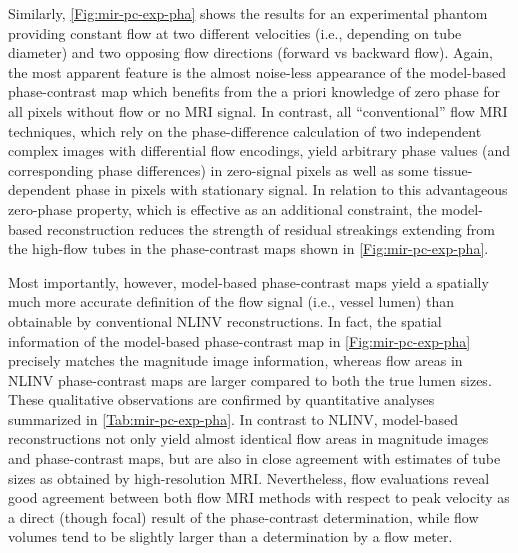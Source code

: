 Similarly, \cref{Fig:mir-pc-exp-pha} shows the results for an experimental phantom providing constant flow at two different velocities (i.e., depending on tube diameter) and two opposing flow directions (forward vs backward flow). Again, the most apparent feature is the almost noise-less appearance of the model-based phase-contrast map which benefits from the a priori knowledge of zero phase for all pixels without flow or no MRI signal. In contrast, all “conventional” flow MRI techniques, which rely on the phase-difference calculation of two independent complex images with differential flow encodings, yield arbitrary phase values (and corresponding phase differences) in zero-signal pixels as well as some tissue-dependent phase in pixels with stationary signal. In relation to this advantageous zero-phase property, which is effective as an additional constraint, the model-based reconstruction reduces the strength of residual streakings extending from the high-flow tubes in the phase-contrast maps shown in \cref{Fig:mir-pc-exp-pha}.

Most importantly, however, model-based phase-contrast maps yield a spatially much more accurate definition of the flow signal (i.e., vessel lumen) than obtainable by conventional NLINV reconstructions. In fact, the spatial information of the model-based phase-contrast map in \cref{Fig:mir-pc-exp-pha} precisely matches the magnitude image information, whereas flow areas in NLINV phase-contrast maps are larger compared to both the true lumen sizes. These qualitative observations are confirmed by quantitative analyses summarized in \cref{Tab:mir-pc-exp-pha}. In contrast to NLINV, model-based reconstructions not only yield almost identical flow areas in magnitude images and phase-contrast maps, but are also in close agreement with estimates of tube sizes as obtained by high-resolution MRI. Nevertheless, flow evaluations reveal good agreement between both flow MRI methods with respect to peak velocity as a direct (though focal) result of the phase-contrast determination, while flow volumes tend to be slightly larger than a determination by a flow meter.
\vspace{10mm}

